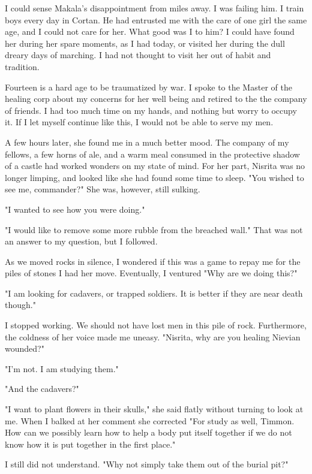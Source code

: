 \documentclass{article}
\begin{document}
I could sense Makala's disappointment from miles away. I was failing him. I train boys every day in Cortan. He had entrusted me with the care of one girl the same age, and I could not care for her. What good was I to him? I could have found her during her spare moments, as I had today, or visited her during the dull dreary days of marching. I had not thought to visit her out of habit and tradition. 

Fourteen is a hard age to be traumatized by war. I spoke to the Master of the healing corp about my concerns for her well being and retired to the the company of friends. I had too much time on my hands, and nothing but worry to occupy it. If I let myself continue like this, I would not be able to serve my men.

A few hours later, she found me in a much better mood. The company of my fellows, a few horns of ale, and a warm meal consumed in the protective shadow of a castle had worked wonders on my state of mind. For her part, Nisrita was no longer limping, and looked like she had found some time to sleep. "You wished to see me, commander?" She was, however, still sulking. 

"I wanted to see how you were doing."

"I would like to remove some more rubble from the breached wall." That was not an answer to my question, but I followed. 

As we moved rocks in silence, I wondered if this was a game to repay me for the piles of stones I had her move. Eventually, I ventured "Why are we doing this?"

"I am looking for cadavers, or trapped soldiers. It is better if they are near death though."

I stopped working. We should not have lost men in this pile of rock. Furthermore, the coldness of her voice made me uneasy. "Nisrita, why are you healing Nievian wounded?"

"I'm not. I am studying them."

"And the cadavers?"

"I want to plant flowers in their skulls," she said flatly without turning to look at me. When I balked at her comment she corrected "For study as well, Timmon. How can we possibly learn how to help a body put itself together if we do not know how it is put together in the first place."

I still did not understand. "Why not simply take them out of the burial pit?"
\end{document}
